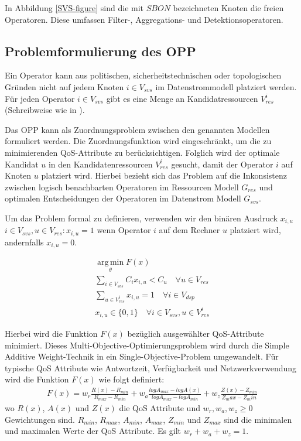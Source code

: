 \documentclass{article}
\begin{document}
In Abbildung \ref{SVS-figure} sind die mit $SBON$ bezeichneten Knoten die freien Operatoren. Diese umfassen Filter-, Aggregations- und Detektionsoperatoren.

\subsection{Problemformulierung des OPP} \label{OPP-Definition}
Ein Operator kann aus politischen, sicherheitstechnischen oder topologischen Gründen \cite{cardellini-optimal_operatorplc} nicht auf jedem Knoten 
$i \in V_{svs}$ im Datenstrommodell platziert werden. 
Für jeden Operator $i \in V_{svs}$ gibt es eine Menge an Kandidatressourcen $V_{res}^i$ (Schreibweise wie in \cite{efficient-operator-placement}).

Das OPP kann als Zuordnungsproblem zwischen den genannten Modellen formuliert werden. 
Die Zuordnungsfunktion wird eingeschränkt, um die zu minimierenden QoS-Attribute zu berücksichtigen. 
Folglich wird der optimale Kandidat $u$ in den Kandidatenressourcen $V_{res}^i$
gesucht, damit der Operator $i$ auf Knoten $u$ platziert wird.
Hierbei bezieht sich das Problem auf die Inkonsistenz zwischen 
logisch benachbarten Operatoren im Ressourcen Modell $G_{res}$ und optimalen Entscheidungen der Operatoren im Datenstrom Modell $G_{svs}$.

Um das Problem formal zu definieren, verwenden wir den binären Ausdruck $x_{i,u}$ $i \in V_{svs}, u \in V_{res}: x_{i,u} = 1$ wenn Operator $i$
auf dem Rechner $u$ platziert wird, andernfalls $x_{i,u} = 0$.

\[ 
    \begin{gathered}
        \operatorname*{arg\,min}_\theta F(x) \\
        \sum_{i \in V_{svs}} C_i x_{i,u} < C_u \quad \forall u \in V_{res} \\ %
        \sum_{u \in V_{res}^i} x_{i,u} = 1 \quad \forall i \in V_{dsp} \\ %
        x_{i,u} \in \{0,1\} \quad \forall i \in V_{svs}, u \in V_{res}^i
    \end{gathered}
\] 

Hierbei wird die Funktion $F(x)$ bezüglich ausgewählter QoS-Attribute minimiert. 
Dieses Multi-Objective-Optimierungsproblem wird durch die Simple Additive Weight-Technik \cite{yoon-multiple-optimization} in ein Single-Objective-Problem umgewandelt.
Für typische QoS Attribute wie Antwortzeit, Verfügbarkeit und Netzwerkverwendung \cite{efficient-operator-placement} wird die Funktion $F(x)$ wie folgt definiert:
\[ 
    \begin{gathered}
        F(x) = w_r \frac{R(x) - R_{min}}{R_{max} - R_{min}} 
        + w_a \frac{log A_{max} - log A(x)}{log A_{max} - log A_{min}} 
        + w_z \frac{Z(x) - Z_{min}}{Z_max - Z_min} 
    \end{gathered}  \label{to-miminize-function}
\] 
wo $R(x)$, $A(x)$ und $Z(x)$ die QoS Attribute und $w_r, w_a, w_z \geq 0$ Gewichtungen sind. $R_{min}$, $R_{max}$, $A_{min}$, $A_{max}$, $Z_{min}$ und $Z_{max}$ sind die minimalen und maximalen Werte der QoS Attribute.
Es gilt $w_r + w_a + w_z = 1$.
\end{document}
